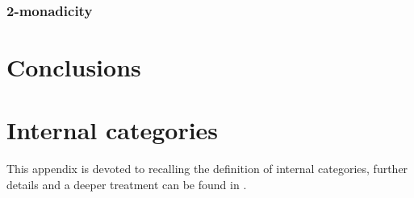 \documentclass[a4paper,UKenglish,cleveref,pdftex,thm-restate,numberwithinsect]{lipics-v2021}
\begin{document}
\subsubsection{2-monadicity}
\section{Conclusions}
	

\appendix

\section{Internal categories}

This appendix is devoted to recalling the definition of internal categories, further details and a deeper treatment can be found in \cite{borceux1994handbook1,maclane2012sheaves,mac2013categories,jacobs1999categorical}.
\end{document}
